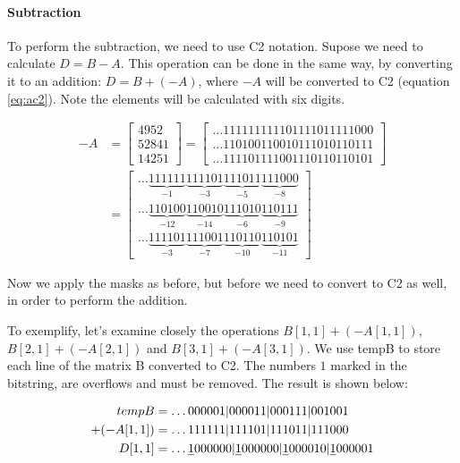 \documentclass[12pt]{article}
\begin{document}
\paragraph{Subtraction}
To perform the subtraction, we need to use C2 notation. Supose  we need to
calculate $D = B - A$. This operation can be done in the same way, by
converting it to an addition: $D = B + (-A)$, where $-A$ will be converted to
C2 (equation \ref{eq:ac2}). Note the elements will be calculated with six
digits.

\begin{align}\label{eq:ac2}
	-A &= \begin{bmatrix}
			4952\\ 
			52841\\ 
			14251
		\end{bmatrix} 
        =
        \begin{bmatrix}
   			\ldots111111111101111011111000\\ 
			\ldots110100110010111010110111\\ 
			\ldots111101111001110110110101
		\end{bmatrix}
        \\\nonumber
        &= \begin{bmatrix}
 \ldots\underbrace{111111}_{-1}\underbrace{111101}_{-3}\underbrace{111011}_{-5}
\underbrace{111000}_{-8}\\
\ldots\underbrace{110100}_{-12}\underbrace{110010}_{-14}\underbrace{111010}_{-6}
\underbrace{110111}_{-9}\\
\ldots\underbrace{111101}_{-3}\underbrace{111001}_{-7}\underbrace{110110}_{-10}
\underbrace{110101}_{-11}
		\end{bmatrix}
\end{align}

Now we apply the masks as before, but before we need to convert to C2 as well,
in order to perform the addition.

To exemplify, let's examine closely the operations $B[1,1] + (-A[1,1])$,
$B[2,1] + (-A[2,1])$ and $B[3,1] + (-A[3,1])$. We use tempB to store each line
of the matrix B converted to C2. The numbers $1$ marked in the bitstring, are
overflows and must be removed. The result is shown below:

\begin{align*}
	tempB	&=\ldots000001|000011|000111|001001\\
+(-A[1,1])	&=\ldots111111|111101|111011|111000\\
	D[1,1]
&=\ldots\sout{1}000000|\sout{1}000000|\sout{1}000010|\sout{1}000001
\end{align*}
\end{document}

